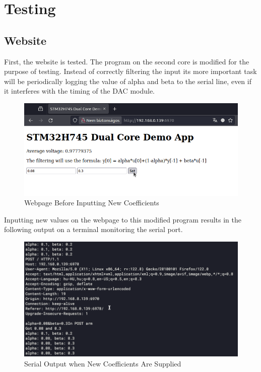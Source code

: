 \chapter{Testing}

\section{Website}

First, the website is tested. The program on the second core is modified for the purpose of testing. Instead of correctly filtering the input its more important task will be periodically logging the value of alpha and beta to the serial line, even if it interferes with the timing of the DAC module.

\begin{figure}[H]
    \centering
    \includegraphics[width=150mm, keepaspectratio]{figures/webpage-test1.png}
    \caption{Webpage Before Inputting New Coefficients}
    \label{fig:webpage-test1}
\end{figure}

Inputting new values on the webpage to this modified program results in the following output on a terminal monitoring the serial port.

\begin{figure}[H]
    \centering
    \includegraphics[width=150mm, keepaspectratio]{figures/coef-log.png}
    \caption{Serial Output when New Coefficients Are Supplied}
    \label{fig:coef-log}
\end{figure}

